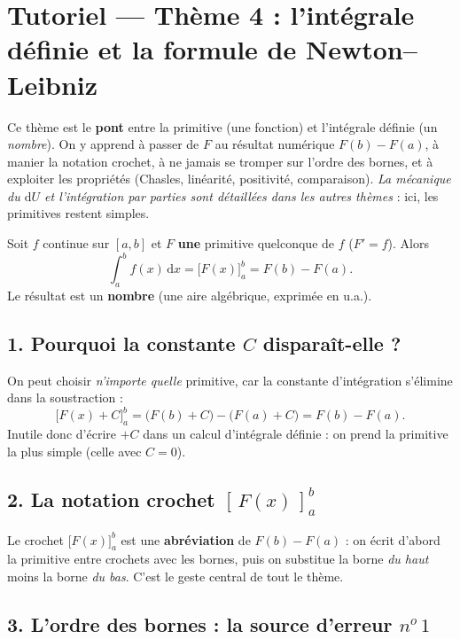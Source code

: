 \documentclass[11pt,a4paper]{article}
\newcommand{\dd}{\mathrm{d}}
\begin{document}
\section*{Tutoriel — Thème 4 : l'intégrale définie et la formule de Newton--Leibniz}

Ce thème est le \textbf{pont} entre la primitive (une fonction) et l'intégrale définie (un
\emph{nombre}). On y apprend à passer de $F$ au résultat numérique $F(b)-F(a)$, à manier la
notation crochet, à ne jamais se tromper sur l'ordre des bornes, et à exploiter les propriétés
(Chasles, linéarité, positivité, comparaison). \emph{La mécanique du $\dd U$ et l'intégration par
parties sont détaillées dans les autres thèmes} : ici, les primitives restent simples.

\begin{idee}
Soit $f$ continue sur $[a,b]$ et $F$ \textbf{une} primitive quelconque de $f$ ($F'=f$). Alors
\[
\boxed{\;\int_a^b f(x)\,\dd x=\bigl[F(x)\bigr]_a^b=F(b)-F(a).\;}
\]
Le résultat est un \textbf{nombre} (une aire algébrique, exprimée en u.a.).
\end{idee}

\subsection*{1. Pourquoi la constante $C$ disparaît-elle ?}

On peut choisir \emph{n'importe quelle} primitive, car la constante d'intégration s'élimine dans
la soustraction :
\[
\bigl[F(x)+C\bigr]_a^b=\bigl(F(b)+C\bigr)-\bigl(F(a)+C\bigr)=F(b)-F(a).
\]
Inutile donc d'écrire $+C$ dans un calcul d'intégrale définie : on prend la primitive la plus
simple (celle avec $C=0$).

\subsection*{2. La notation crochet $[\,F(x)\,]_a^b$}

Le crochet $\bigl[F(x)\bigr]_a^b$ est une \textbf{abréviation} de $F(b)-F(a)$ : on écrit d'abord la
primitive entre crochets avec les bornes, puis on substitue la borne \emph{du haut} moins la borne
\emph{du bas}. C'est le geste central de tout le thème.

\subsection*{3. L'ordre des bornes : la source d'erreur $n^{o}\,1$}
\end{document}
